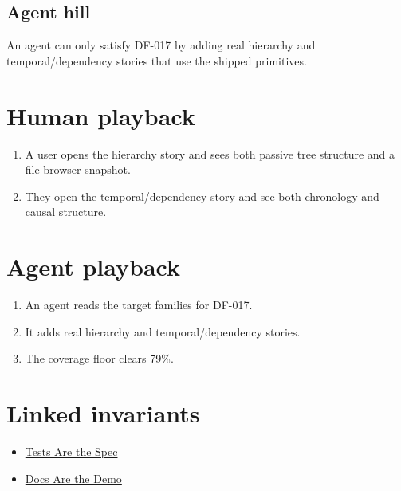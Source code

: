 \subsection{Agent hill}\label{record-079-agent-hill}

An agent can only satisfy DF-017 by adding real hierarchy and temporal/dependency stories that use the shipped primitives.

\section{Human playback}\label{record-079-human-playback}

\begin{enumerate}
\def\labelenumi{\arabic{enumi}.}
\tightlist
\item
  A user opens the hierarchy story and sees both passive tree structure and a file-browser snapshot.
\item
  They open the temporal/dependency story and see both chronology and causal structure.
\end{enumerate}

\section{Agent playback}\label{record-079-agent-playback}

\begin{enumerate}
\def\labelenumi{\arabic{enumi}.}
\tightlist
\item
  An agent reads the target families for DF-017.
\item
  It adds real hierarchy and temporal/dependency stories.
\item
  The coverage floor clears 79\%.
\end{enumerate}

\section{Linked invariants}\label{record-079-linked-invariants}

\begin{itemize}
\tightlist
\item
  \href{https://github.com/flyingrobots/bijou/blob/cbd70612140e7a450d764b3c7be1c6af878b99bc/docs/invariants/tests-are-the-spec.md}{Tests Are the Spec}
\item
  \href{https://github.com/flyingrobots/bijou/blob/cbd70612140e7a450d764b3c7be1c6af878b99bc/docs/invariants/docs-are-the-demo.md}{Docs Are the Demo}
\end{itemize}

